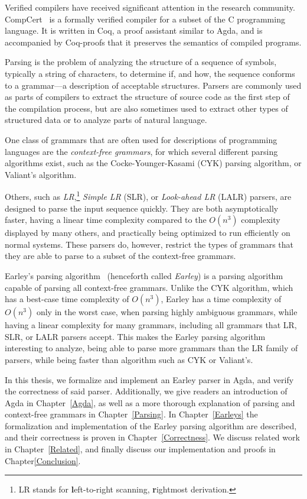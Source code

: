 	Verified compilers have received significant attention in the research
	community. CompCert~\cite{Leroy} is a formally verified compiler for a
	subset of the C programming language. It is written in Coq, a proof
	assistant similar to Agda, and is accompanied by Coq-proofs that it
	preserves the semantics of compiled programs.

	Parsing is the problem of analyzing the structure of a sequence of
	symbols, typically a string of characters, to determine if, and how, the
	sequence conforms to a grammar---a description of acceptable structures.
	Parsers are commonly used as parts of compilers to extract the structure of
	source code as the first step of the compilation process, but are also
	sometimes used to extract other types of structured data or to analyze
	parts of natural language.

	One class of grammars that are often used for descriptions of programming
	languages are the \emph{context-free grammars}, for which several different
	parsing algorithms exist, such as the Cocke-Younger-Kasami (CYK) parsing
	algorithm, or Valiant's algorithm.

	Others, such as \emph{LR},\footnote{LR stands for \textbf{l}eft-to-right
	scanning, \textbf{r}ightmost derivation.} \emph{Simple LR} (SLR), or
	\emph{Look-ahead LR} (LALR) parsers, are designed to parse the input
	sequence quickly. They are both asymptotically faster, having a linear time
	complexity compared to the $O(n^3)$ complexity displayed by many others,
	and practically being optimized to run efficiently on normal systems.
	These parsers do, however, restrict the types of grammars that they are
	able to parse to a subset of the context-free grammars.

	Earley's parsing algorithm~\cite{Earley} (henceforth called \emph{Earley})
	is a parsing algorithm capable of parsing all context-free grammars. Unlike
	the CYK algorithm, which has a best-case time complexity of $O(n^3)$,
	Earley has a time complexity of $O(n^3)$ only in the worst case, when
	parsing highly ambiguous grammars, while having a linear complexity for
	many grammars, including all grammars that LR, SLR, or LALR parsers accept.
	This makes the Earley parsing algorithm interesting to analyze, being able
	to parse more grammars than the LR family of parsers, while being faster
	than algorithm such as CYK or Valiant's.

	In this thesis, we formalize and implement an Earley parser in Agda, and
	verify the correctness of said parser. Additionally, we give readers an
	introduction of Agda in Chapter~\ref{Agda}, as well as a more thorough
	explanation of parsing and context-free grammars in Chapter~\ref{Parsing}.
	In Chapter~\ref{Earleys} the formalization and implementation of the Earley
	parsing algorithm are described, and their correctness is proven in
	Chapter~\ref{Correctness}. We discuss related work in
	Chapter~\ref{Related}, and finally discuss our implementation and proofs in
	Chapter\ref{Conclusion}.

